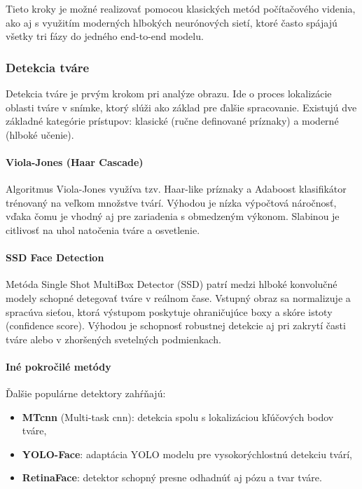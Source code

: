 Tieto kroky je možné realizovať pomocou klasických metód počítačového videnia, ako aj s využitím moderných hlbokých neurónových sietí, ktoré často spájajú všetky tri fázy do jedného end-to-end modelu.

\subsubsection{Detekcia tváre}
Detekcia tváre je prvým krokom pri analýze obrazu. Ide o proces lokalizácie oblasti tváre v snímke, ktorý slúži ako základ pre ďalšie spracovanie. Existujú dve základné kategórie prístupov: klasické (ručne definované príznaky) a moderné (hlboké učenie).

\paragraph{Viola-Jones (Haar Cascade)}
Algoritmus Viola-Jones využíva tzv. Haar-like príznaky a Adaboost klasifikátor trénovaný na veľkom množstve tvárí. Výhodou je nízka výpočtová náročnosť, vďaka čomu je vhodný aj pre zariadenia s obmedzeným výkonom. Slabinou je citlivosť na uhol natočenia tváre a osvetlenie.

\paragraph{SSD Face Detection}
Metóda Single Shot MultiBox Detector (SSD) patrí medzi hlboké konvolučné modely schopné detegovať tváre v reálnom čase. Vstupný obraz sa normalizuje a spracúva sieťou, ktorá výstupom poskytuje ohraničujúce boxy a skóre istoty (confidence score). Výhodou je schopnosť robustnej detekcie aj pri zakrytí časti tváre alebo v zhoršených svetelných podmienkach.

\paragraph{Iné pokročilé metódy}
Ďalšie populárne detektory zahŕňajú:
\begin{itemize}
    \item \textbf{MT\gls{cnn}} (Multi-task \gls{cnn}): detekcia spolu s lokalizáciou kľúčových bodov tváre,
    \item \textbf{YOLO-Face}: adaptácia YOLO modelu pre vysokorýchlostnú detekciu tvárí,
    \item \textbf{RetinaFace}: detektor schopný presne odhadnúť aj pózu a tvar tváre.
\end{itemize}


